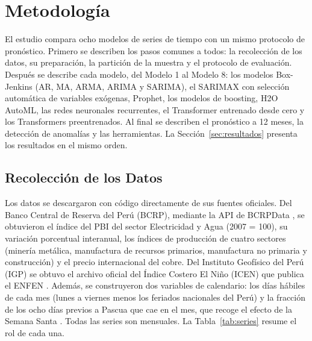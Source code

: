 \documentclass[conference]{IEEEtran}
\begin{document}
\section{Metodología}
\label{sec:metodologia}

El estudio compara ocho modelos de series de tiempo con un mismo protocolo de pronóstico. Primero se describen los pasos comunes a todos: la recolección de los datos, su preparación, la partición de la muestra y el protocolo de evaluación. Después se describe cada modelo, del Modelo 1 al Modelo 8: los modelos Box-Jenkins (AR, MA, ARMA, ARIMA y SARIMA), el SARIMAX con selección automática de variables exógenas, Prophet, los modelos de boosting, H2O AutoML, las redes neuronales recurrentes, el Transformer entrenado desde cero y los Transformers preentrenados. Al final se describen el pronóstico a 12 meses, la detección de anomalías y las herramientas. La Sección~\ref{sec:resultados} presenta los resultados en el mismo orden.

\subsection{Recolección de los Datos}

Los datos se descargaron con código directamente de sus fuentes oficiales. Del Banco Central de Reserva del Perú (BCRP), mediante la API de BCRPData \cite{bcrpdata}, se obtuvieron el índice del PBI del sector Electricidad y Agua (2007 = 100), su variación porcentual interanual, los índices de producción de cuatro sectores (minería metálica, manufactura de recursos primarios, manufactura no primaria y construcción) y el precio internacional del cobre. Del Instituto Geofísico del Perú (IGP) se obtuvo el archivo oficial del Índice Costero El Niño (ICEN) que publica el ENFEN \cite{igp_icen,takahashi2015}. Además, se construyeron dos variables de calendario: los días hábiles de cada mes (lunes a viernes menos los feriados nacionales del Perú) y la fracción de los ocho días previos a Pascua que cae en el mes, que recoge el efecto de la Semana Santa \cite{bell1983}. Todas las series son mensuales. La Tabla~\ref{tab:series} resume el rol de cada una.
\end{document}
